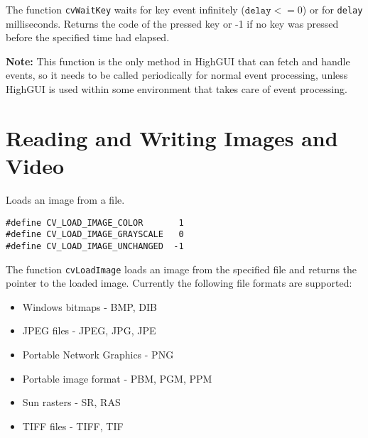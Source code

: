 The function \texttt{cvWaitKey} waits for key event infinitely ($ \texttt{delay} <= 0$) or for \texttt{delay} milliseconds. Returns the code of the pressed key or -1 if no key was pressed before the specified time had elapsed.

\textbf{Note:} This function is the only method in HighGUI that can fetch and handle events, so it needs to be called periodically for normal event processing, unless HighGUI is used within some environment that takes care of event processing.


\section{Reading and Writing Images and Video}

Loads an image from a file.


\begin{lstlisting}
#define CV_LOAD_IMAGE_COLOR       1
#define CV_LOAD_IMAGE_GRAYSCALE   0
#define CV_LOAD_IMAGE_UNCHANGED  -1
\end{lstlisting}

\begin{description}
\end{description}

The function \texttt{cvLoadImage} loads an image from the specified file and returns the pointer to the loaded image. Currently the following file formats are supported:
\begin{itemize}
\item Windows bitmaps - BMP, DIB
\item JPEG files - JPEG, JPG, JPE
\item Portable Network Graphics - PNG
\item Portable image format - PBM, PGM, PPM
\item Sun rasters - SR, RAS
\item TIFF files - TIFF, TIF
\end{itemize}


